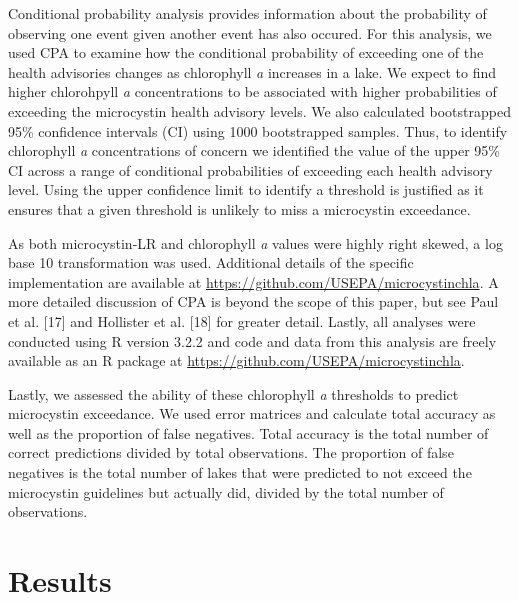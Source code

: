 \documentclass[11pt,]{article}
\begin{document}
Conditional probability analysis provides information about the
probability of observing one event given another event has also occured.
For this analysis, we used CPA to examine how the conditional
probability of exceeding one of the health advisories changes as
chlorophyll \emph{a} increases in a lake. We expect to find higher
chlorohpyll \emph{a} concentrations to be associated with higher
probabilities of exceeding the microcystin health advisory levels. We
also calculated bootstrapped 95\% confidence intervals (CI) using 1000
bootstrapped samples. Thus, to identify chlorophyll \emph{a}
concentrations of concern we identified the value of the upper 95\% CI
across a range of conditional probabilities of exceeding each health
advisory level. Using the upper confidence limit to identify a threshold
is justified as it ensures that a given threshold is unlikely to miss a
microcystin exceedance.

As both microcystin-LR and chlorophyll \emph{a} values were highly right
skewed, a log base 10 transformation was used. Additional details of the
specific implementation are available at
\url{https://github.com/USEPA/microcystinchla}. A more detailed
discussion of CPA is beyond the scope of this paper, but see Paul et al.
{[}17{]} and Hollister et al. {[}18{]} for greater detail. Lastly, all
analyses were conducted using R version 3.2.2 and code and data from
this analysis are freely available as an R package at
\href{https://github.com/USAPE/microcystinchla}{https://github.com/USEPA/microcystinchla}.

Lastly, we assessed the ability of these chlorophyll \emph{a} thresholds
to predict microcystin exceedance. We used error matrices and calculate
total accuracy as well as the proportion of false negatives. Total
accuracy is the total number of correct predictions divided by total
observations. The proportion of false negatives is the total number of
lakes that were predicted to not exceed the microcystin guidelines but
actually did, divided by the total number of observations.

\section{Results}\label{results}
\end{document}
